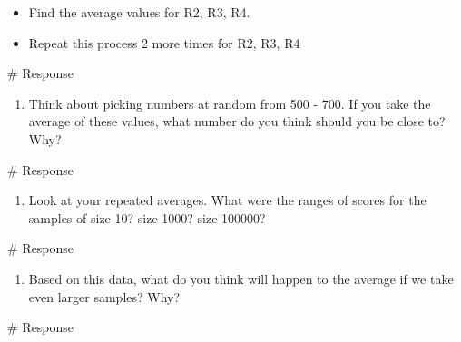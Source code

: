 \documentclass[
  letterpaper,
  DIV=11,
  numbers=noendperiod]{scrreprt}
\newenvironment{Shaded}{\begin{snugshade}}{\end{snugshade}}
\newcommand{\CommentTok}[1]{\textcolor[rgb]{0.37,0.37,0.37}{#1}}
\providecommand{\tightlist}{%
  \setlength{\itemsep}{0pt}\setlength{\parskip}{0pt}}\usepackage{longtable,booktabs,array}
\begin{document}
\begin{itemize}
\tightlist
\item
  Find the average values for R2, R3, R4.
\item
  Repeat this process 2 more times for R2, R3, R4
\end{itemize}

\begin{Shaded}
\begin{Highlighting}[]
\CommentTok{\# Response}
\end{Highlighting}
\end{Shaded}

\begin{enumerate}
\def\labelenumi{\arabic{enumi}.}
\setcounter{enumi}{12}
\tightlist
\item
  Think about picking numbers at random from 500 - 700. If you take the
  average of these values, what number do you think should you be close
  to? Why?
\end{enumerate}

\begin{Shaded}
\begin{Highlighting}[]
\CommentTok{\# Response}
\end{Highlighting}
\end{Shaded}

\begin{enumerate}
\def\labelenumi{\arabic{enumi}.}
\setcounter{enumi}{13}
\tightlist
\item
  Look at your repeated averages. What were the ranges of scores for the
  samples of size 10? size 1000? size 100000?
\end{enumerate}

\begin{Shaded}
\begin{Highlighting}[]
\CommentTok{\# Response}
\end{Highlighting}
\end{Shaded}

\begin{enumerate}
\def\labelenumi{\arabic{enumi}.}
\setcounter{enumi}{14}
\tightlist
\item
  Based on this data, what do you think will happen to the average if we
  take even larger samples? Why?
\end{enumerate}

\begin{Shaded}
\begin{Highlighting}[]
\CommentTok{\# Response}
\end{Highlighting}
\end{Shaded}
\end{document}
